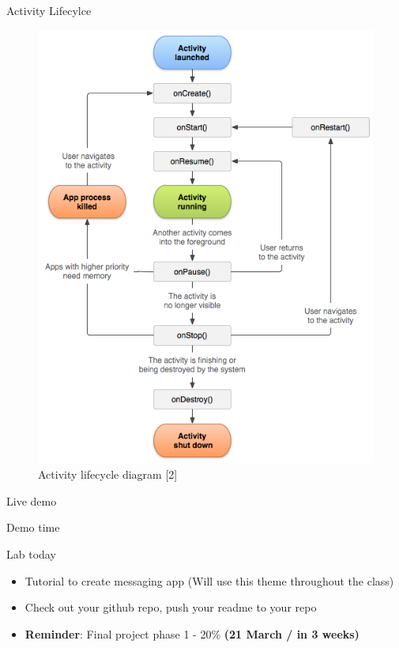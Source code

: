\documentclass{beamer}
\begin{document}
\begin{frame}{Activity Lifecylce}
    \begin{center}
        \begin{figure}
            \includegraphics[scale=0.32]{activity_lifecycle}
            \caption{Activity lifecycle diagram [2]}
        \end{figure}
    \end{center}
\end{frame}


\begin{frame}{Live demo}
    \begin{center}
        Demo time
    \end{center}
\end{frame}
  
  
  \begin{frame}[fragile]{Lab today}
     \begin{itemize}
        \item Tutorial to create messaging app (Will use this theme throughout the class)
    	\item Check out your github repo, push your readme to your repo
    	\item \textbf{Reminder}: Final project phase 1 - 20\% \textbf{(21 March / in 3 weeks)}
	\end{itemize}
\end{frame}
\end{document}
